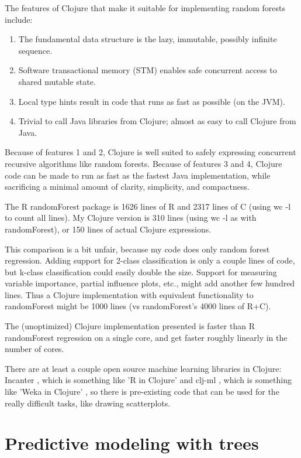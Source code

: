 \documentclass[11pt,openany,american,usenames,dvipsnames,svgnames,x11names,table,isodate]{article}
\numberwithin{equation}{section}
\numberwithin{figure}{section}
\begin{document}
The features of Clojure that make it suitable for implementing random
forests include:
\begin{enumerate}
\item The fundamental data structure is the lazy, immutable, possibly infinite
sequence.
\item Software transactional memory (STM) enables safe concurrent access
to shared mutable state.
\item Local type hints result in code that runs as fast as possible (on
the JVM).
\item Trivial to call Java libraries from Clojure; almost as easy to call
Clojure from Java.
\end{enumerate}
Because of features 1 and 2, Clojure is well suited to safely expressing
concurrent recursive algorithms like random forests. Because of features
3 and 4, Clojure code can be made to run as fast as the fastest Java
implementation, while sacrificing a minimal amount of clarity, simplicity,
and compactness. 

The R randomForest package is 1626 lines of R and 2317 lines of C
(using wc -l to count all lines). My Clojure version is 310 lines
(using wc -l as with randomForest), or 150 lines of actual Clojure
expressions. 

This comparison is a bit unfair, because my code does only random
forest regression. Adding support for 2-class classification is only
a couple lines of code, but k-class classification could easily double
the size. Support for measuring variable importance, partial influence
plots, etc., might add another few hundred lines. Thus a Clojure implementation
with equivalent functionality to randomForest might be 1000 lines
(vs randomForest's 4000 lines of R+C).

The (unoptimized) Clojure implementation presented is faster than
R randomForest regression on a single core, and get faster roughly
linearly in the number of cores.

There are at least a couple open source machine learning libraries
in Clojure: Incanter \cite{incanter-2011}, which is something like
'R in Clojure' and clj-ml \cite{clj-ml-2012}, which is something
like 'Weka in Clojure' \cite{weka-3}, so there is pre-existing code
that can be used for the really difficult tasks, like drawing scatterplots.

\newpage{}


\section{\label{sec:Predictive-modeling-with}Predictive modeling with trees}
\end{document}
